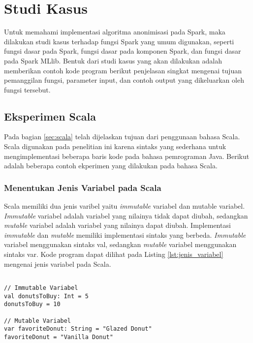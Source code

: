 \newpage
\section{Studi Kasus}
Untuk memahami implementasi algoritma anonimisasi pada Spark, maka dilakukan studi kasus terhadap fungsi Spark yang umum digunakan, seperti fungsi dasar pada Spark, fungsi dasar pada komponen Spark, dan fungsi dasar pada Spark MLlib. Bentuk dari studi kasus yang akan dilakukan adalah memberikan contoh kode program berikut penjelasan singkat mengenai tujuan pemanggilan fungsi, parameter input, dan contoh output yang dikeluarkan oleh fungsi tersebut.

\subsection{Eksperimen Scala}
Pada bagian \ref{sec:scala} telah dijelaskan tujuan dari penggunaan bahasa Scala. Scala digunakan pada penelitian ini karena sintaks yang sederhana untuk mengimplementasi beberapa baris kode pada bahasa pemrograman Java. Berikut adalah beberapa contoh ekperimen yang dilakukan pada bahasa Scala.

\subsubsection{Menentukan Jenis Variabel pada Scala}
Scala memiliki dua jenis varibel yaitu \textit{immutable} variabel dan mutable variabel. \textit{Immutable} variabel adalah variabel yang nilainya tidak dapat diubah, sedangkan \textit{mutable} variabel adalah variabel yang nilainya dapat diubah. Implementasi \textit{immutable} dan \textit{mutable} memiliki implementasi sintaks yang berbeda. \textit{Immutable} variabel menggunakan sintaks val, sedangkan \textit{mutable} variabel menggunakan sintaks var. Kode program dapat dilihat pada Listing \ref{lst:jenis_variabel} mengenai jenis variabel pada Scala.

\begin{lstlisting}[basicstyle=\ttfamily, frame=single,
	columns=fullflexible, keepspaces=true, breaklines=true, label=lst:jenis_variabel, caption=Menentukan Jenis Variabel pada Scala]
	
// Immutable Variabel
val donutsToBuy: Int = 5
donutsToBuy = 10

// Mutable Variabel
var favoriteDonut: String = "Glazed Donut"
favoriteDonut = "Vanilla Donut"


\end{lstlisting}

